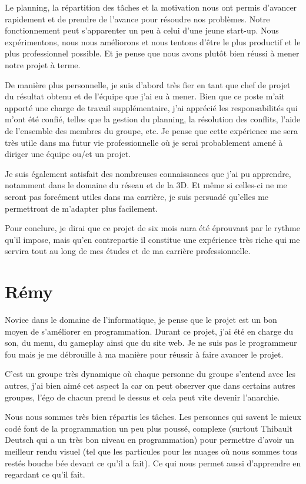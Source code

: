 \documentclass[11pt]{report}
\begin{document}
Le planning, la répartition des tâches et la motivation nous ont permis d’avancer rapidement et de prendre de l’avance pour résoudre nos problèmes. Notre fonctionnement peut s’apparenter un peu à celui d’une jeune start-up. Nous expérimentons, nous nous améliorons et nous tentons d’être le plus productif et le plus professionnel possible. Et je pense que nous avons plutôt bien réussi à mener notre projet à terme.

De manière plus personnelle, je suis d’abord très fier en tant que chef de projet du résultat obtenu et de l’équipe que j’ai eu à mener. Bien que ce poste m’ait apporté une charge de travail supplémentaire, j’ai apprécié les responsabilités qui m’ont été confié, telles que la gestion du planning, la résolution des conflits, l’aide de l’ensemble des membres du groupe, etc. Je pense que cette expérience me sera très utile dans ma futur vie professionnelle où je serai probablement amené à diriger une équipe ou/et un projet.

Je suis également satisfait des nombreuses connaissances que j’ai pu apprendre, notamment dans le domaine du réseau et de la 3D. Et même si celles-ci ne me seront pas forcément utiles dans ma carrière, je suis persuadé qu’elles me permettront de m’adapter plus facilement.

Pour conclure, je dirai que ce projet de six mois aura été éprouvant par le rythme qu’il impose, mais qu’en contrepartie il constitue une expérience très riche qui me servira tout au long de mes études et de ma carrière professionnelle.

\section{Rémy}

Novice dans le domaine de l'informatique, je pense que le projet est un bon moyen de s'améliorer en programmation. Durant ce projet, j'ai été en charge du son, du menu, du gameplay ainsi que du site web. Je ne suis pas le programmeur fou mais je me débrouille à ma manière pour réussir à faire avancer le projet.

C’est un groupe très dynamique où chaque personne du groupe s’entend avec les autres, j’ai bien aimé cet aspect la car on peut observer que dans certains autres groupes, l’égo de chacun prend le dessus et cela peut vite devenir l’anarchie.

Nous nous sommes très bien répartis les tâches. Les personnes qui savent le mieux codé font de la programmation un peu plus poussé, complexe (surtout Thibault Deutsch qui a un très bon niveau en programmation) pour permettre d’avoir un meilleur rendu visuel (tel que les particules pour les nuages où nous sommes tous restés bouche bée devant ce qu’il a fait). Ce qui nous permet aussi d’apprendre en regardant ce qu’il fait.
\end{document}
